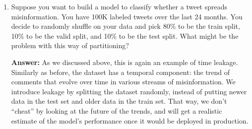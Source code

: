 \documentclass{article}
\newenvironment{QandA}{\begin{enumerate}[label=\arabic*.]}{\end{enumerate}}
\newenvironment{InnerQandA}{\begin{enumerate}[label=\roman*.]}{\end{enumerate}}
\newenvironment{answer}{\par\normalfont \textbf{Answer:}}{}
\begin{document}
\begin{QandA}
\begin{InnerQandA}
        \item How do you detect feature leakage?
        \begin{answer}
            Several cases that can indicate potential feature leakage:
            \begin{itemize}
                \item The model performance is too good to be true.
                \item A feature has abnormally high correlation with the target value.
                \item After training, the model weights for a given feature are significantly higher than the others.
            \end{itemize}
            (See more \href{https://www.analyticsvidhya.com/blog/2021/07/data-leakage-and-its-effect-on-the-performance-of-an-ml-model/}{here}.)
        \end{answer}
    \end{InnerQandA}

    \item Suppose you want to build a model to classify whether a tweet spreads misinformation. You have 100K labeled tweets over the last 24 months. You decide to randomly shuffle on your data and pick 80\% to be the train split, 10\% to be the valid split, and 10\% to be the test split. What might be the problem with this way of partitioning?
    \begin{answer}
        As we discussed above, this is again an example of time leakage. Similarly as before, the dataset has a temporal component: the trend of comments that evolve over time in various streams of misinformation. We introduce leakage by splitting the dataset randomly, instead of putting newer data in the test set and older data in the train set. That way, we don't ``cheat'' by looking at the future of the trends, and will get a realistic estimate of the model's performance once it would be deployed in production. 
    \end{answer}


\end{QandA}
\end{document}
